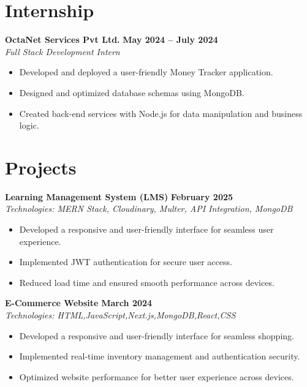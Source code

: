 \documentclass[a4paper,10pt]{article}
\begin{document}
\section*{Internship}
\textbf{OctaNet Services Pvt Ltd.} \hfill \textbf{May 2024 -- July 2024} \\
\textit{Full Stack Development Intern}
\begin{itemize}[noitemsep, topsep=0pt]
    \item Developed and deployed a user-friendly Money Tracker application.
    \item Designed and optimized database schemas using MongoDB.
    \item Created back-end services with Node.js for data manipulation and business logic.
\end{itemize}

\section*{Projects}
\textbf{Learning Management System (LMS)} \hfill \textbf{February 2025} \\
\textit{Technologies: MERN Stack, Cloudinary, Multer, API Integration, MongoDB}
\begin{itemize}[noitemsep, topsep=0pt]
    \item Developed a responsive and user-friendly interface for seamless user experience.
    \item Implemented JWT authentication for secure user access.
    \item Reduced load time and ensured smooth performance across devices.
\end{itemize}
\textbf{E-Commerce Website} \hfill \textbf{March 2024} \\
\textit{Technologies: HTML,JavaScript,Next.js,MongoDB,React,CSS}
\begin{itemize}[noitemsep, topsep=0pt]
    \item Developed a responsive and user-friendly interface for seamless shopping.
    \item Implemented real-time inventory management and authentication security.
    \item Optimized website performance for better user experience across devices.
\end{itemize}
\end{document}
